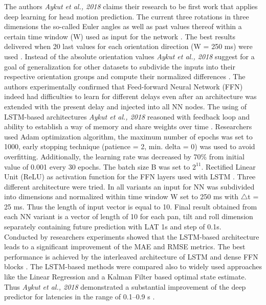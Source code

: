 The authors \textit{Aykut et al., 2018} claims their research to be first work that applies deep learning for head motion prediction. The current three rotations in three dimensions the so-called Euler angles as well as past values thereof within a certain time window (W) used as input for the network \cite{delay_compensation_360}. The best results delivered when 20 last values for each orientation direction (W = 250 ms) were used \cite{delay_compensation_360}. Instead of the absolute orientation values \textit{Aykut et al., 2018} suggest for a goal of generalization for other datasets to subdivide the inputs into their respective orientation groups and compute their normalized differences \cite{delay_compensation_360}. The authors experimentally confirmed that Feed-forward Neural Network (FFN) indeed had difficulties to learn for different delays even after an architecture was extended with the present delay and injected into all NN nodes. The using of LSTM-based architectures \textit{Aykut et al., 2018} reasoned with feedback loop and ability to establish a way of memory and share weights over time \cite{delay_compensation_360}. Researchers used Adam optimization algorithm, the maximum number of epochs was set to 1000, early stopping technique (patience = 2, min. delta = 0) was used to avoid overfitting. Additionally, the learning rate was decreased by 70\% from initial value of 0.001 every 30 epochs. The batch size B was set to $2^{11}$. Rectified Linear Unit (ReLU) as activation function for the FFN layers used with LSTM \cite{delay_compensation_360}. Three different architecture were tried. In all variants an input for NN was subdivided into dimensions and normalized within time window W set to 250 ms with $\triangle$t = 25 ms. Thus the length of input vector is equal to 10. Final result obtained from each NN variant is a vector of length of 10 for each pan, tilt and roll dimension separately containing future prediction with LAT 1s and step of 0.1s. \\
Conducted by researchers experiments showed that the LSTM-based architecture leads to a significant improvement of the MAE and RMSE metrics. The best performance is achieved by the interleaved architecture of LSTM and dense FFN blocks \cite{delay_compensation_360}. The LSTM-based methods were compared also to widely used approaches like the Linear Regression and a Kalman Filter based optimal state estimate. Thus \textit{Aykut et al., 2018} demonstrated a substantial improvement of the deep predictor for latencies in the range of 0.1–0.9 s \cite{delay_compensation_360}.\\ 
